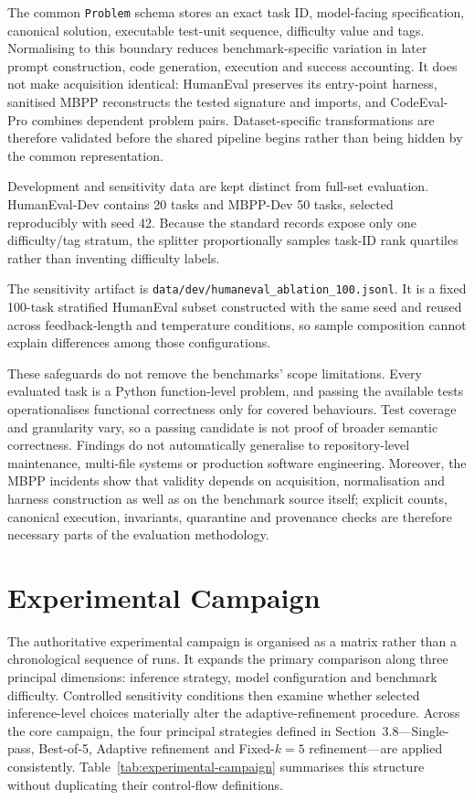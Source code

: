 The common \texttt{Problem} schema stores an exact task ID, model-facing specification, canonical solution, executable test-unit sequence, difficulty value and tags. Normalising to this boundary reduces benchmark-specific variation in later prompt construction, code generation, execution and success accounting. It does not make acquisition identical: HumanEval preserves its entry-point harness, sanitised MBPP reconstructs the tested signature and imports, and CodeEval-Pro combines dependent problem pairs. Dataset-specific transformations are therefore validated before the shared pipeline begins rather than being hidden by the common representation.

Development and sensitivity data are kept distinct from full-set evaluation. HumanEval-Dev contains 20 tasks and MBPP-Dev 50 tasks, selected reproducibly with seed 42. Because the standard records expose only one difficulty/tag stratum, the splitter proportionally samples task-ID rank quartiles rather than inventing difficulty labels.

The sensitivity artifact is \texttt{data/dev/humaneval\_ablation\_100.jsonl}. It is a fixed 100-task stratified HumanEval subset constructed with the same seed and reused across feedback-length and temperature conditions, so sample composition cannot explain differences among those configurations.

These safeguards do not remove the benchmarks' scope limitations. Every evaluated task is a Python function-level problem, and passing the available tests operationalises functional correctness only for covered behaviours. Test coverage and granularity vary, so a passing candidate is not proof of broader semantic correctness. Findings do not automatically generalise to repository-level maintenance, multi-file systems or production software engineering. Moreover, the MBPP incidents show that validity depends on acquisition, normalisation and harness construction as well as on the benchmark source itself; explicit counts, canonical execution, invariants, quarantine and provenance checks are therefore necessary parts of the evaluation methodology.

\section{Experimental Campaign}
\label{sec:experimental-campaign}

The authoritative experimental campaign is organised as a matrix rather than a chronological sequence of runs. It expands the primary comparison along three principal dimensions: inference strategy, model configuration and benchmark difficulty. Controlled sensitivity conditions then examine whether selected inference-level choices materially alter the adaptive-refinement procedure. Across the core campaign, the four principal strategies defined in Section~3.8---Single-pass, Best-of-5, Adaptive refinement and Fixed-$k=5$ refinement---are applied consistently. Table~\ref{tab:experimental-campaign} summarises this structure without duplicating their control-flow definitions.

